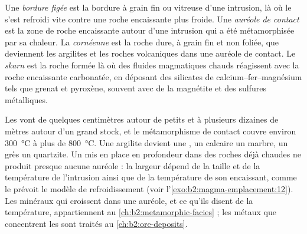 \begin{definition}\label{def:b2:magma-emplacement:aureole}
Une \emph{bordure figée} est la bordure à grain fin ou vitreuse d'une
intrusion, là où le  s'est refroidi vite contre une roche encaissante plus froide. Une
\emph{auréole de contact} est la zone de roche encaissante autour d'une
intrusion qui a été métamorphisée par sa chaleur. La \emph{cornéenne} est la
roche dure, à grain fin et non foliée, que deviennent les argilites et les roches volcaniques dans une
auréole de contact. Le \emph{skarn} est la roche formée là où des fluides magmatiques chauds
réagissent avec la roche encaissante carbonatée, en déposant des silicates de calcium--fer--magnésium
tels que grenat et pyroxène, souvent avec de la magnétite et des sulfures métalliques.
\end{definition}

Les  vont de quelques centimètres autour de petits  et  à
plusieurs dizaines de mètres autour d'un grand stock, et le métamorphisme de contact couvre
environ \qty{300}{\celsius} à plus de \qty{800}{\celsius}. Une argilite devient une
, un calcaire un marbre, un grès un quartzite. Un  mis en place en profondeur
dans des roches déjà chaudes ne produit presque aucune auréole : la largeur dépend de la
taille et de la température de l'intrusion ainsi que de la température de son encaissant, comme
le prévoit le modèle de refroidissement (voir l'\cref{exo:b2:magma-emplacement:12}). Les minéraux qui croissent dans une auréole,
et ce qu'ils disent de la température, appartiennent au \cref{ch:b2:metamorphic-facies} ;
les métaux que concentrent les  sont traités au \cref{ch:b2:ore-deposits}.

